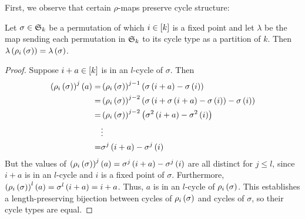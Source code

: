 \documentclass[distribution,draft]{brandiss} %
\numberwithin{section}{chapter}
\numberwithin{figure}{chapter}
\begin{document}
First, we observe that certain $\rho$-maps preserve cycle structure:
\begin{lemma}
  \label{lem:rhofp}
  Let $\sigma \in  \mathfrak{S}_{k} $ be a permutation of which $i \in \left[ {k} \right]$ is a fixed point and let $\lambda$ be the map sending each permutation in $ \mathfrak{S}_{k} $ to its cycle type as a partition of $k$.
  Then $\lambda \left( {\rho_{i} \left( {\sigma} \right)} \right) = \lambda \left( {\sigma} \right)$.
\end{lemma}
\begin{proof}
  Suppose $i + a \in \left[ {k} \right]$ is in an $l$-cycle of $\sigma$.
  Then
  \begin{align*}
    \left( {\rho_{i} \left( {\sigma} \right)} \right)^{j} \left( {a} \right) =& \left( {\rho_{i} \left( {\sigma} \right)} \right)^{j - 1} \left( {\sigma \left( {i + a} \right) - \sigma \left( {i} \right)} \right) \\
    =& \left( {\rho_{i} \left( {\sigma} \right)} \right)^{j - 2} \left( {\sigma \left( {i + \sigma \left( {i + a} \right) - \sigma \left( {i} \right)} \right) - \sigma \left( {i} \right)} \right) \\
    =& \left( {\rho_{i} \left( {\sigma} \right)} \right)^{j - 2} \left( {\sigma^{2} \left( {i + a} \right) - \sigma^{2} \left( {i} \right)} \right) \\
    &\vdots \\
    =& \sigma^{j} \left( {i + a} \right) - \sigma^{j} \left( {i} \right)
  \end{align*}
  But the values of $\left( {\rho_{i} \left( {\sigma} \right)} \right)^{j} \left( {a} \right) = \sigma^{j} \left( {i + a} \right) - \sigma^{j} \left( {i} \right)$ are all distinct for $j \leq l$, since $i + a$ is in an $l$-cycle and $i$ is a fixed point of $\sigma$.
  Furthermore, $\left( {\rho_{i} \left( {\sigma} \right)} \right)^{l} \left( {a} \right) = \sigma^{l} \left( {i + a} \right) = i+a$.
  Thus, $a$ is in an $l$-cycle of $\rho_{i} \left( {\sigma} \right)$.
  This establishes a length-preserving bijection between cycles of $\rho_{i} \left( {\sigma} \right)$ and cycles of $\sigma$, so their cycle types are equal.
\end{proof}
\end{document}
